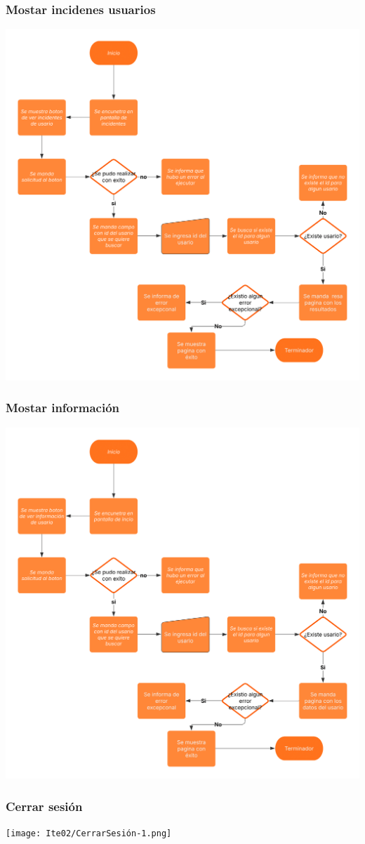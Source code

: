 \newpage
\subsubsection*{Mostar incidenes usuarios}
\begin{center}
    \includegraphics[scale = .9]{Ite02/MostrarIncidenteUsario-1.png}
\end{center}

\newpage
\subsubsection*{Mostar información}
\begin{center}
    \includegraphics[scale = .9]{Ite02/MostrarInformacio-1.png}
\end{center}

\newpage
\subsubsection*{Cerrar sesión}
\begin{center}
    \texttt{[image: Ite02/CerrarSesión-1.png]}
\end{center}


